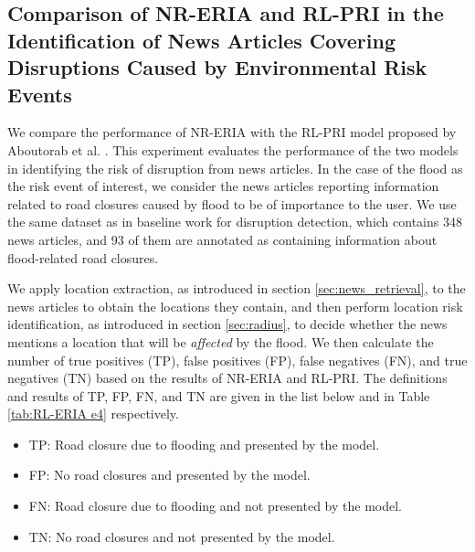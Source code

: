 \documentclass[
]{ceurart}
\begin{document}
\subsection{Comparison of NR-ERIA and RL-PRI in the Identification of News Articles Covering Disruptions Caused by Environmental Risk Events}

We compare the performance of NR-ERIA with the RL-PRI model proposed by Aboutorab et al. \cite{aboutorab2021reinforcement}. This experiment evaluates the performance of the two models in identifying the risk of disruption from news articles. In the case of the flood as the risk event of interest, we consider the news articles reporting information related to road closures caused by flood to be of importance to the user. 
We use the same dataset as in baseline work \cite{aboutorab2021reinforcement} for disruption detection, which contains 348 news articles, and 93 of them are annotated as containing information about flood-related road closures. 

We apply location extraction, as introduced in section \ref{sec:news_retrieval}, to the news articles to obtain the locations they contain, and then perform location risk identification, as introduced in section \ref{sec:radius}, to decide whether the news mentions a location that will be \textit{affected} by the flood. 
We then calculate the number of true positives (TP), false positives (FP), false negatives (FN), and true negatives (TN) based on the results of NR-ERIA and RL-PRI. The definitions and results of TP, FP, FN, and TN are given in the list below and in Table \ref{tab:RL-ERIA e4} respectively.

\begin{itemize}
    \item TP: Road closure due to flooding and presented by the model.
    \item FP: No road closures and presented by the model.
    \item FN: Road closure due to flooding and not presented by the model.
    \item TN: No road closures and not presented by the model.
\end{itemize}

\begin{table}[h]
\caption{TPs, FPs, FNs, and TNs of NR-ERIA and RL-PRI.}
\label{tab:RL-ERIA e4}
  \centering
\end{table}
\end{document}
